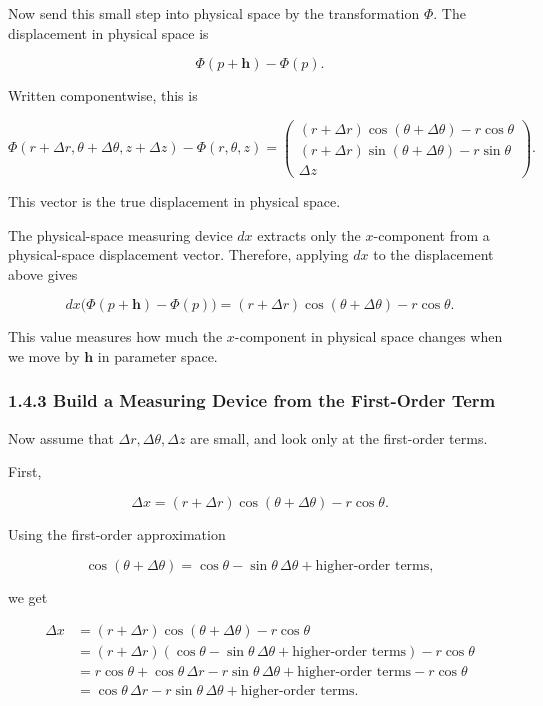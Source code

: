 \documentclass[a4paper,12pt,openany]{book}
\begin{document}
Now send this small step into physical space by the transformation
\(\Phi\). The displacement in physical space is

\[
\Phi(p+\mathbf h)-\Phi(p).
\]

Written componentwise, this is

\[
\Phi(r+\Delta r,\theta+\Delta\theta,z+\Delta z)
-
\Phi(r,\theta,z)
=
\begin{pmatrix}
(r+\Delta r)\cos(\theta+\Delta\theta)-r\cos\theta\\
(r+\Delta r)\sin(\theta+\Delta\theta)-r\sin\theta\\
\Delta z
\end{pmatrix}.
\]

This vector is the true displacement in physical space.

The physical-space measuring device \(dx\) extracts only the
\(x\)-component from a physical-space displacement vector. Therefore,
applying \(dx\) to the displacement above gives

\[
dx\bigl(\Phi(p+\mathbf h)-\Phi(p)\bigr)
=
(r+\Delta r)\cos(\theta+\Delta\theta)-r\cos\theta.
\]

This value measures how much the \(x\)-component in physical space
changes when we move by \(\mathbf h\) in parameter space.

\hypertarget{build-a-measuring-device-from-the-first-order-term}{%
\subsubsection{1.4.3 Build a Measuring Device from the First-Order
Term}\label{build-a-measuring-device-from-the-first-order-term}}

Now assume that \(\Delta r,\Delta\theta,\Delta z\) are small, and look
only at the first-order terms.

First,

\[
\Delta x
=
(r+\Delta r)\cos(\theta+\Delta\theta)-r\cos\theta.
\]

Using the first-order approximation

\[
\cos(\theta+\Delta\theta)
=
\cos\theta-\sin\theta\,\Delta\theta
+
\text{higher-order terms},
\]

we get

\[
\begin{aligned}
\Delta x
&=
(r+\Delta r)\cos(\theta+\Delta\theta)-r\cos\theta\\
&=
(r+\Delta r)(\cos\theta-\sin\theta\,\Delta\theta+\text{higher-order terms})-r\cos\theta\\
&=
r\cos\theta
+\cos\theta\,\Delta r
-r\sin\theta\,\Delta\theta
+\text{higher-order terms}
-r\cos\theta\\
&=
\cos\theta\,\Delta r
-r\sin\theta\,\Delta\theta
+\text{higher-order terms}.
\end{aligned}
\]
\end{document}
